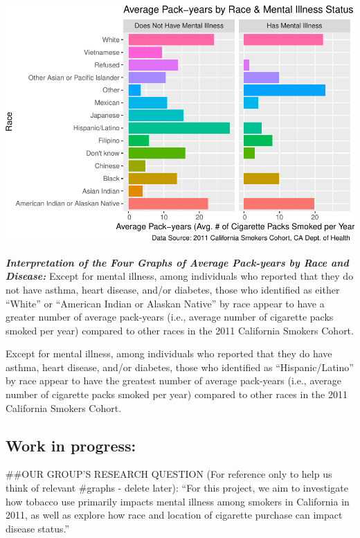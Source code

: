 \documentclass[
]{article}
\begin{document}
\includegraphics{Milestone_4_files/figure-latex/bar graph of cigarette pack-years by race and othmenill-1.pdf}
\newpage

\emph{\textbf{Interpretation of the Four Graphs of Average Pack-years by
Race and Disease:}} \newline Except for mental illness, among
individuals who reported that they do not have asthma, heart disease,
and/or diabetes, those who identified as either ``White'' or ``American
Indian or Alaskan Native'' by race appear to have a greater number of
average pack-years (i.e., average number of cigarette packs smoked per
year) compared to other races in the 2011 California Smokers Cohort.

Except for mental illness, among individuals who reported that they do
have asthma, heart disease, and/or diabetes, those who identified as
``Hispanic/Latino'' by race appear to have the greatest number of
average pack-years (i.e., average number of cigarette packs smoked per
year) compared to other races in the 2011 California Smokers Cohort.

\newpage

\hypertarget{work-in-progress}{%
\subsection{Work in progress:}\label{work-in-progress}}

\#\#OUR GROUP'S RESEARCH QUESTION (For reference only to help us think
of relevant \#graphs - delete later): ``For this project, we aim to
investigate how tobacco use primarily impacts mental illness among
smokers in California in 2011, as well as explore how race and location
of cigarette purchase can impact disease status.''
\end{document}
